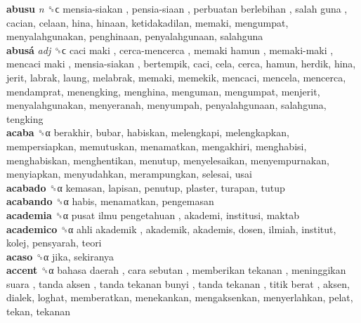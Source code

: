 \textbf{abusu} \emph{n}  ␝ϲ   mensia-siakan ,  pensia-siaan ,  perbuatan berlebihan ,  salah guna , cacian, celaan, hina, hinaan, ketidakadilan, memaki, mengumpat, menyalahgunakan, penghinaan, penyalahgunaan, salahguna  \\
\textbf{abusá} \emph{adj}  ␝ϲ   caci maki ,  cerca-mencerca ,  memaki hamun ,  memaki-maki ,  mencaci maki ,  mensia-siakan , bertempik, caci, cela, cerca, hamun, herdik, hina, jerit, labrak, laung, melabrak, memaki, memekik, mencaci, mencela, mencerca, mendamprat, menengking, menghina, menguman, mengumpat, menjerit, menyalahgunakan, menyeranah, menyumpah, penyalahgunaan, salahguna, tengking  \\
\textbf{acaba} ␝α  berakhir, bubar, habiskan, melengkapi, melengkapkan, mempersiapkan, memutuskan, menamatkan, mengakhiri, menghabisi, menghabiskan, menghentikan, menutup, menyelesaikan, menyempurnakan, menyiapkan, menyudahkan, merampungkan, selesai, usai  \\
\textbf{acabado} ␝α  kemasan, lapisan, penutup, plaster, turapan, tutup  \\
\textbf{acabando} ␝α  habis, menamatkan, pengemasan  \\
\textbf{academia} ␝α   pusat ilmu pengetahuan , akademi, institusi, maktab  \\
\textbf{academico} ␝α   ahli akademik , akademik, akademis, dosen, ilmiah, institut, kolej, pensyarah, teori  \\
\textbf{acaso} ␝α  jika, sekiranya  \\
\textbf{accent} ␝α   bahasa daerah ,  cara sebutan ,  memberikan tekanan ,  meninggikan suara ,  tanda aksen ,  tanda tekanan bunyi ,  tanda tekanan ,  titik berat , aksen, dialek, loghat, memberatkan, menekankan, mengaksenkan, menyerlahkan, pelat, tekan, tekanan  \\
